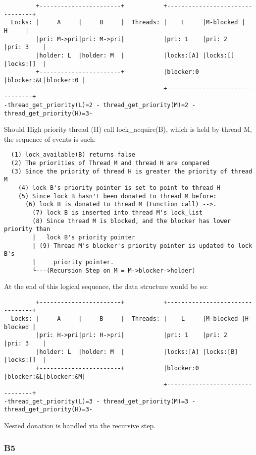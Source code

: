 \documentclass[a4wide, 11pt]{article}
\begin{document}
\begin{verbatim}
         +-----------------------+           +--------------------------------+
  Locks: |     A     |     B     |  Threads: |    L     |M-blocked |    H     |
         |pri: M->pri|pri: M->pri|           |pri: 1    |pri: 2    |pri: 3    |
         |holder: L  |holder: M  |           |locks:[A] |locks:[]  |locks:[]  |
         +-----------------------+           |blocker:0 |blocker:&L|blocker:0 |
                                             +--------------------------------+
-thread_get_priority(L)=2 - thread_get_priority(M)=2 - thread_get_priority(H)=3-
\end{verbatim}

Should High priority thread (H) call lock\_acquire(B), which is held by thread M, the sequence of events is such:
\begin{verbatim}
  (1) lock_available(B) returns false
  (2) The priorities of Thread M and thread H are compared
  (3) Since the priority of thread H is greater the priority of thread M
    (4) lock B's priority pointer is set to point to thread H
    (5) Since lock B hasn't been donated to thread M before:
      (6) lock B is donated to thread M (Function call) -->.
        (7) lock B is inserted into thread M's lock_list
        (8) Since thread M is blocked, and the blocker has lower priority than
        |   lock B's priority pointer
        | (9) Thread M's blocker's priority pointer is updated to lock B's 
        |     priority pointer.
        └---(Recursion Step on M = M->blocker->holder)
\end{verbatim}

At the end of this logical sequence, the data structure would be so:

\begin{verbatim}
         +-----------------------+           +--------------------------------+
  Locks: |     A     |     B     |  Threads: |    L     |M-blocked |H-blocked |
         |pri: H->pri|pri: H->pri|           |pri: 1    |pri: 2    |pri: 3    |
         |holder: L  |holder: M  |           |locks:[A] |locks:[B] |locks:[]  |
         +-----------------------+           |blocker:0 |blocker:&L|blocker:&M|
                                             +--------------------------------+
-thread_get_priority(L)=3 - thread_get_priority(M)=3 - thread_get_priority(H)=3-
\end{verbatim}

Nested donation is handled via the recursive step.

\subsubsection{B5}
\end{document}

